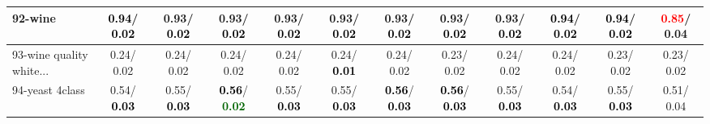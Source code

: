 \begin{table}[h]
\begin{center}
{\begin{tabular}{lc|c|c|c|c|c|c|c|c|c|c}
92-wine & \textcolor{black}{\textbf{  0.94}}/\textcolor{black}{\textbf{  0.02}} &   0.93/\textcolor{black}{\textbf{  0.02}} &   0.93/\textcolor{black}{\textbf{  0.02}} &   0.93/\textcolor{black}{\textbf{  0.02}} &   0.93/\textcolor{black}{\textbf{  0.02}} &   0.93/\textcolor{black}{\textbf{  0.02}} &   0.93/\textcolor{black}{\textbf{  0.02}} &   0.93/\textcolor{black}{\textbf{  0.02}} & \textcolor{black}{\textbf{  0.94}}/\textcolor{black}{\textbf{  0.02}} & \textcolor{black}{\textbf{  0.94}}/\textcolor{black}{\textbf{  0.02}} & \textcolor{red}{\textbf{  0.85}}/  0.04 \\ \hline
93-wine quality white... &   0.24/  0.02 &   0.24/  0.02 &   0.24/  0.02 &   0.24/  0.02 &   0.24/\textcolor{black}{\textbf{  0.01}} &   0.24/  0.02 &   0.23/  0.02 &   0.24/  0.02 &   0.24/  0.02 &   0.23/  0.02 &   0.23/  0.02 \\
94-yeast 4class &   0.54/\textcolor{black}{\textbf{  0.03}} &   0.55/\textcolor{black}{\textbf{  0.03}} & \textcolor{black}{\textbf{  0.56}}/\textcolor{darkgreen}{\textbf{  0.02}} &   0.55/\textcolor{black}{\textbf{  0.03}} &   0.55/\textcolor{black}{\textbf{  0.03}} & \textcolor{black}{\textbf{  0.56}}/\textcolor{black}{\textbf{  0.03}} & \textcolor{black}{\textbf{  0.56}}/\textcolor{black}{\textbf{  0.03}} &   0.55/\textcolor{black}{\textbf{  0.03}} &   0.54/\textcolor{black}{\textbf{  0.03}} &   0.55/\textcolor{black}{\textbf{  0.03}} &   0.51/  0.04 \\\end{tabular}
}\label{strats2aSVM}
\end{center}
\end{table}
